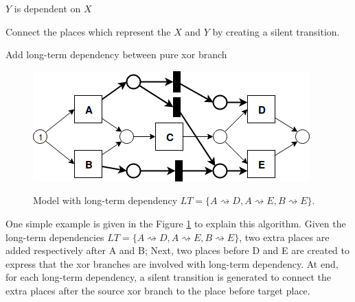 \begin{algorithm}[!ht]
	\SetAlgoLined
	$Y$ is dependent on $X$\;
	
	Connect the places which represent the $X$ and $Y$ by creating a silent transition.
	\caption{Add long-term dependency between pure xor branch}
	\label{alg: Adding method}
\end{algorithm}
\begin{figure}
	\includegraphics[width=\textwidth]{figures/algorithm/LT_Seq_01_Silent_01.png}
	\label{fig:add-algorithm-example}
	\caption{Model with long-term dependency $LT=\{ A\rightsquigarrow D, A\rightsquigarrow E, B\rightsquigarrow E\}. $ }
\end{figure}
One simple example is given in the Figure \ref{fig:add-algorithm-example} to explain this algorithm. Given the long-term dependencies $LT=\{ A\rightsquigarrow D, A\rightsquigarrow E, B\rightsquigarrow E\}$, two extra places are added respectively after A and B; Next, two places before D and E are created to express that the xor branches are involved with long-term dependency. At end, for each long-term dependency, a silent transition is generated to connect the extra places after the source xor branch to the place before target place. 

